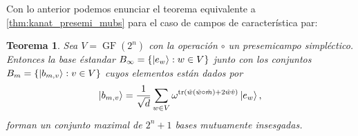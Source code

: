 \documentclass[a4paper]{report}
\DeclareMathOperator{\tr}{tr}
\DeclareMathOperator{\GF}{GF}
\newtheorem{theorem}{Teorema}
\begin{document}
  Con lo anterior podemos enunciar el teorema equivalente a
  \ref{thm:kanat_presemi_mubs} para el caso de campos de
  característica par:
  \begin{theorem}
    \label{thm:kanat_even}
    Sea $V = \GF(2^{n})$ con la operación $\circ$ un
    presemicampo simpléctico. Entonces la base éstandar
    $B_\infty = \{\ket{e_w} : w \in V\}$ junto con los
    conjuntos $B_m = \{\ket{b_{m,v}} : v \in V\}$ cuyos
    elementos están dados por
    \begin{equation}
      \ket{b_{m,v}}
      = \frac{1}{\sqrt{d}} \sum_{w \in V}^{}
      \omega^{\tr\left(
        \hat w ( \hat w \circ \hat m ) + 2 \hat w \hat v
      \right) } \ket{e_w},
    \end{equation}
    forman un conjunto maximal de $2^{n} + 1$ bases
    mutuamente insesgadas.
  \end{theorem}
\end{document}
